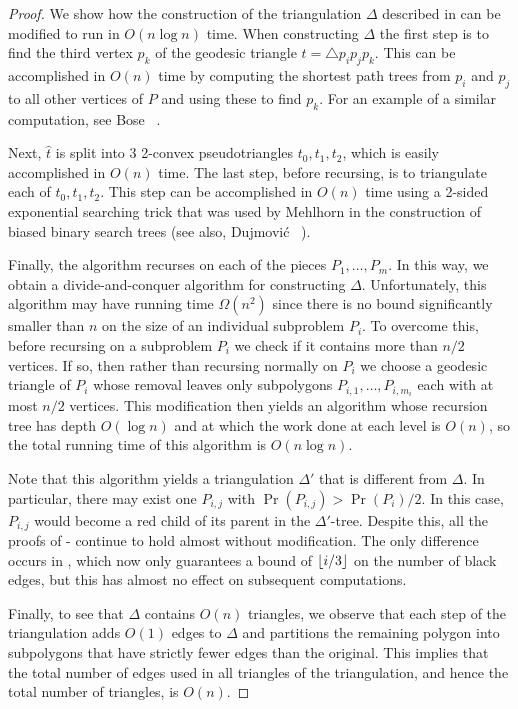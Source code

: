 \documentclass[lotsofwhite]{patmorin}
\newcommand{\z}[1]{{\hat{#1}}}
\begin{document}
\begin{proof}
We show how the construction of the triangulation $\Delta$ described in
 can be modified to run in $O(n\log n)$ time.  When
constructing $\Delta$ the first step is to find the third vertex $p_k$ of the
geodesic triangle $t=\triangle p_i p_j p_k$.  This can be accomplished
in $O(n)$ time by computing the shortest path trees from $p_i$ and
$p_j$ to all other vertices of $P$ and using these to find $p_k$.  For
an example of a similar computation, see Bose \etal\
\cite[Section~2.2]{bdhlim07}.

Next, $\z t$ is split into 3 2-convex pseudotriangles $t_0,t_1,t_2$,
which is easily accomplished in $O(n)$ time.  The last step, before
recursing, is to triangulate each of $t_0,t_1,t_2$.  This step can be
accomplished in $O(n)$ time using a 2-sided exponential searching
trick that was used by Mehlhorn \cite{m75} in the construction of
biased binary search trees (see also, Dujmovi\'c \etal\
\cite[Theorem~1]{cdilm08}).

Finally, the algorithm recurses on each of the pieces
$P_1,\ldots,P_m$.  In this way, we obtain a divide-and-conquer
algorithm for constructing $\Delta$.  Unfortunately, this algorithm
may have running time $\Omega(n^2)$ since there is no bound
significantly smaller than $n$ on the size of an individual subproblem
$P_i$.  To overcome this, before recursing on a subproblem $P_i$ we
check if it contains more than $n/2$ vertices.  If so, then rather
than recursing normally on $P_i$ we choose a geodesic triangle of
$P_i$ whose removal leaves only subpolygons $P_{i,1},\ldots,P_{i,m_i}$
each with at most $n/2$ vertices.  This modification then yields an
algorithm whose recursion tree has depth $O(\log n)$ and at which the
work done at each level is $O(n)$, so the total running time of this
algorithm is $O(n\log n)$.

Note that this algorithm yields a triangulation $\Delta'$ that is
different from $\Delta$.  In particular, there may exist one $P_{i,j}$
with $\Pr(P_{i,j})>\Pr(P_i)/2$.  In this case, $P_{i,j}$ would become
a red child of its parent in the $\Delta'$-tree.  Despite this, all
the proofs of \lemref{A}-\lemref{Z} continue to hold almost without
modification.  The only difference occurs in \lemref{t-red-black},
which now only guarantees a bound of $\left\lfloor i/3 \right\rfloor$ on the number of
black edges, but this has almost no effect on subsequent computations.

Finally, to see that $\Delta$ contains $O(n)$ triangles, we observe
that each step of the triangulation adds $O(1)$ edges to $\Delta$ and
partitions the remaining polygon into subpolygons that have strictly
fewer edges than the original.  This implies that the total number of
edges used in all triangles of the triangulation, and hence the total
number of triangles, is $O(n)$.
\end{proof}
\end{document}
